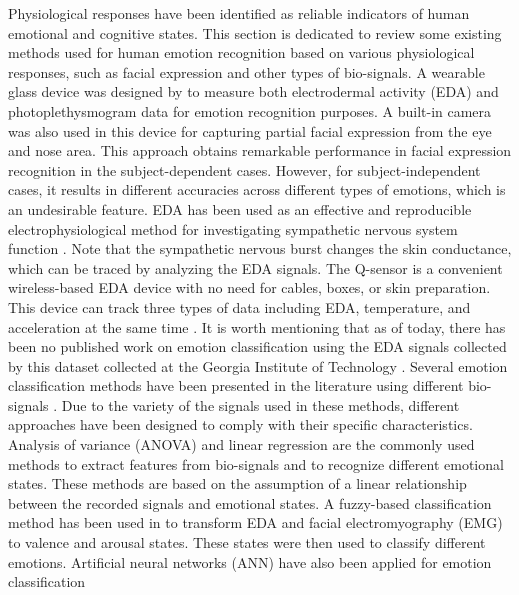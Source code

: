 Physiological responses have been identified as reliable indicators of human emotional 
and cognitive states. This section is dedicated to review some existing methods used for 
human emotion recognition based on various physiological responses, such as facial 
expression and other types of bio-signals.    
A wearable glass device was designed by \cite{WearableDevice2016} to measure both electrodermal 
activity (EDA) and photoplethysmogram data for emotion recognition purposes. A built-in 
camera was also used in this device for capturing partial facial expression from the eye 
and nose area. This approach obtains remarkable performance in facial expression 
recognition in the subject-dependent cases. However, for subject-independent cases, 
it results in different accuracies across different types of emotions, which is an 
undesirable feature. 
EDA has been used as an effective and reproducible electrophysiological method for 
investigating sympathetic nervous system function \cite{WearableDevice2016, AssociationBetween2013, SympatheticSkin1984, PrincipalComponent2000}. Note that the sympathetic nervous 
burst changes the skin conductance, which can be traced by analyzing the EDA signals\cite{SkinConduct2006, SympatheticSkin1981, DecodeChild2013}. The Q-sensor 
is a convenient wireless-based EDA device with no need for cables, boxes, or skin 
preparation. This device can track three types of data including EDA, temperature, 
and acceleration at the same time \cite{Validation2013}. It is worth mentioning that 
as of today, there has been no published work on emotion classification using the 
EDA signals collected by this dataset collected at the Georgia Institute of 
Technology \cite{DecodeChild2013}.
Several emotion classification methods have been presented in the literature using 
different bio-signals \cite{EmotionInten2014, EmotionResp2013, ElectAct2000, HeteroKnow2016}. Due to the variety of the signals used in these methods, 
different approaches have been designed to comply with their specific characteristics. 
Analysis of variance (ANOVA) and linear regression \cite{ElectAct2000} are the 
commonly used methods to extract features from bio-signals and to recognize different 
emotional states. These methods are based on the assumption of a linear relationship 
between the recorded signals and emotional states. A fuzzy-based classification 
method \cite{EmotionInten2014} has been used in to transform EDA and facial 
electromyography (EMG) to valence and arousal states. These states were then used 
to classify different emotions. 
Artificial neural networks (ANN) have also been applied for emotion classification 
